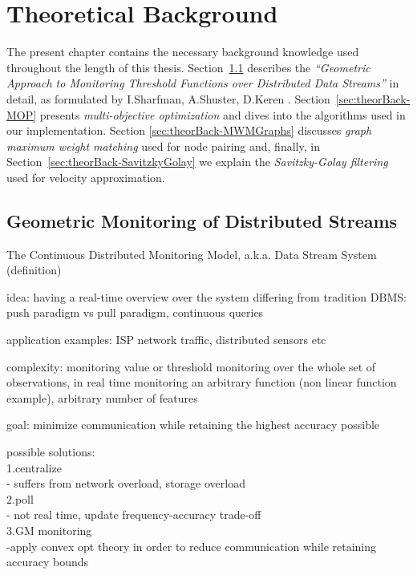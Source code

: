  \chapter{Theoretical Background} \label{chap:theorBack}

The present chapter contains the necessary background knowledge used throughout the length of this thesis. Section~\ref{sec:theorBack-GM} describes the \emph{``Geometric Approach to Monitoring Threshold Functions over Distributed Data Streams''} in detail, as formulated by I.Sharfman, A.Shuster, D.Keren \cite{GM-sharfmanShusterKeren}. Section~\ref{sec:theorBack-MOP} presents \emph{multi-objective optimization} and  dives into the algorithms used in our implementation. Section \ref{sec:theorBack-MWMGraphs} discusses \emph{graph maximum weight matching} used for node pairing and, finally, in Section~\ref{sec:theorBack-SavitzkyGolay} we explain the \emph{Savitzky-Golay filtering} used for velocity approximation.


\section{Geometric Monitoring of Distributed Streams} \label{sec:theorBack-GM}

The Continuous Distributed Monitoring Model, a.k.a. Data Stream System (definition)

idea: having a real-time overview over the system
	differing from tradition DBMS: push paradigm vs pull paradigm, continuous queries

application examples: ISP network traffic, distributed sensors etc

complexity: monitoring value or threshold monitoring over the whole set of observations, in real time
			monitoring an arbitrary function (non linear function example), 
			arbitrary number of features

goal: minimize communication while retaining the highest accuracy possible

possible solutions:\\
	1.centralize\\
		- suffers from network overload, storage overload\\
	2.poll\\
		- not real time, update frequency-accuracy trade-off\\
	3.GM monitoring\\
	    -apply convex opt theory in order to reduce communication while retaining accuracy bounds

